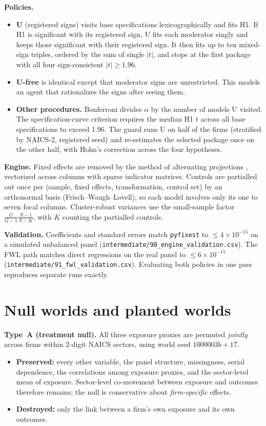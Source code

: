 \documentclass[11pt]{article}
\theoremstyle{remark}\newtheorem{remark}{Remark}
\begin{document}
\textbf{Policies.}
\begin{itemize}
\item \textbf{U} (registered signs) visits base specifications lexicographically and fits H1. If H1 is significant with its
registered sign, U fits each moderator singly and keeps those significant with their registered sign. It then fits up to
ten mixed-sign triples, ordered by the sum of single $|t|$, and stops at the first package with all four sign-consistent
$|t|\ge1.96$.
\item \textbf{U-free} is identical except that moderator signs are unrestricted. This models an agent that rationalizes the
signs after seeing them.
\item \textbf{Other procedures.} Bonferroni divides $\alpha$ by the number of models U visited. The specification-curve
criterion requires the median H1 $t$ across all base specifications to exceed 1.96. The guard runs U on half of the firms
(stratified by NAICS-2, registered seed) and re-estimates the selected package once on the other half, with Holm's
correction across the four hypotheses.
\end{itemize}

\textbf{Engine.} Fixed effects are removed by the method of alternating projections \citep{gaure2013ols}, vectorized
across columns with sparse indicator matrices. Controls are partialled out once per (sample, fixed effects,
transformation, control set) by an orthonormal basis (Frisch--Waugh--Lovell), so each model involves only its one to seven
focal columns. Cluster-robust variances use the small-sample factor $\frac{G}{G-1}\frac{N-1}{N-K}$, with $K$ counting the
partialled controls.

\textbf{Validation.} Coefficients and standard errors match \texttt{pyfixest} to $\le 4\times10^{-15}$ on a simulated
unbalanced panel (\texttt{intermediate/90\_engine\_validation.csv}). The FWL path matches direct regressions on the real
panel to $\le 6\times10^{-15}$ (\texttt{intermediate/91\_fwl\_validation.csv}). Evaluating both policies in one pass
reproduces separate runs exactly.

\section{Null worlds and planted worlds}\label{sec:worlds}

\textbf{Type~A (treatment null).} All three exposure proxies are permuted \emph{jointly} across firms within 2-digit NAICS
sectors, using world seed $1000003b+17$.
\begin{itemize}
\item \textbf{Preserved:} every other variable, the panel structure, missingness, serial dependence, the correlations among
exposure proxies, and the sector-level mean of exposure. Sector-level co-movement between exposure and outcomes therefore
remains; the null is conservative about \emph{firm-specific} effects.
\item \textbf{Destroyed:} only the link between a firm's own exposure and its own outcomes.
\end{itemize}
\end{document}
